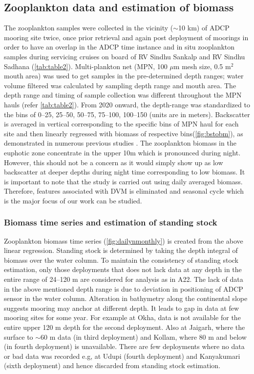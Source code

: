 \documentclass[authoryear,review,12pt]{elsarticle}
\begin{document}
	\subsection{Zooplankton data and estimation of biomass}
	The zooplankton  samples were collected in the vicinity ($\sim$10 km) of ADCP mooring site twice, once prior retrieval and again post deployment of moorings in order to have an overlap in the ADCP time instance and in situ zooplankton samples during servicing cruises on board of RV Sindhu Sankalp and RV Sindhu Sadhana (\cref{tab:table2}). Multi-plankton net (MPN, 100 $\mu$m mesh size, 0.5 m$^2$ mouth area) was used to get samples in the pre-determined depth ranges; water volume filtered was calculated by sampling depth range and mouth area. The depth range and timing of sample collection was different throughout the MPN hauls (refer \cref{tab:table2}). From 2020 onward, the depth-range was standardized to the bins of 0--25, 25--50, 50--75, 75--100, 100--150 (units are in meters). Backscatter is averaged in vertical corresponding to the specific bins of MPN haul for each site and then linearly regressed with biomass of respective bins(\cref{fig:bstobm}), as demonstrated in numerous previous studies \citep{flagg1989use,heywood1991estimation,jiang2007temporal,aparna2022seasonal}. The zooplankton biomass in the euphotic zone concentrate in the upper 10m which is pronounced during night. However, this should not be a concern as it would simply show up as low backscatter at deeper depths during night time corresponding to low biomass. It is important to note that the study is carried out using daily averaged biomass. Therefore, features associated with DVM is eliminated and seasonal cycle \citep[A22]{jiang2007temporal} which is the major focus of our work can be studied. 
	
	\subsubsection{Biomass time series and estimation of standing stock}
	\label{sec:biomasstimeseries}
	Zooplankton biomass time series (\cref{fig:dailynmonthly}) is created from the above linear regression. Standing stock is determined by taking the depth integral of biomass over the water column. To maintain the consistency of standing stock estimation, only those deployments that does not lack data at any depth in the entire range of 24--120 m are considered for analysis as in A22. The lack of data in the above mentioned depth range is due to deviation in positioning of ADCP sensor in the water column. Alteration in bathymetry along the continental slope suggests mooring may anchor at different depth. It leads to gap in data at few mooring sites for some year. For example at Okha, data is not available for the entire upper 120 m depth for the second deployment. Also at Jaigarh, where the surface to $\sim$60 m data (in third deployment) and Kollam, where 80 m and below (in fourth deployment) is unavailable. There are few deployments where no data or bad data was recorded e.g, at Udupi (fourth deployment) and Kanyakumari (sixth deployment) and hence discarded from standing stock estimation. 	
\end{document}
